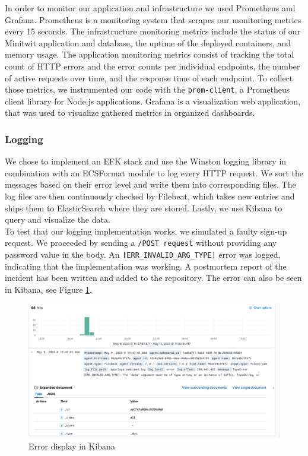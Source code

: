 In order to monitor our application and infrastructure we used Prometheus and Grafana. Prometheus is a monitoring system that scrapes our monitoring metrics every 15 seconds. The infrastructure monitoring metrics include the status of our Minitwit application and database, the uptime of the deployed containers, and memory usage. The application monitoring metrics consist of tracking the total count of HTTP errors and the error counts per individual endpoints, the number of active requests over time, and the response time of each endpoint. To collect those metrics, we instrumented our code with the \texttt{prom-client}, a Prometheus client library for Node.js applications. Grafana is a visualization web application, that was used to visualize gathered metrics in organized dashboards.

\subsubsection{Logging}
We chose to implement an EFK stack and use the Winston logging library \cite{winston} in combination with an ECSFormat module to log every HTTP request. We sort the messages based on their error level and write them into corresponding files. The log files are then continuously checked by Filebeat, which takes new entries and ships them to ElasticSearch where they are stored. Lastly, we use Kibana to query and visualize the data.\\

To test that our logging implementation works, we simulated a faulty sign-up request. We proceeded by sending a \texttt{/POST request} without providing any password value in the body. An \texttt{[ERR\_INVALID\_ARG\_TYPE]} error was logged, indicating that the implementation was working. A postmortem report of the incident has been written and added to the repository. The error can also be seen in Kibana, see Figure \ref{fig:kibana-bug}.

\begin{figure}[H]
    \centering
    \includegraphics[width=\linewidth]{images/kibana-bug.png} 
    \caption{Error display in Kibana}
    \label{fig:kibana-bug}
\end{figure}


